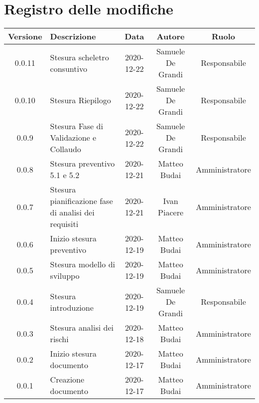 \section*{Registro delle modifiche}

\begin{center}
	\begin{longtable}{|c|p{5cm}|c|c|c|}
	\hline
	\rowcolor{lighter-grayer}
	\textbf{Versione} & \textbf{Descrizione} & \textbf{Data} & \textbf{Autore} & \textbf{Ruolo} \\
	\hline
	\endfirsthead

	0.0.11 & Stesura scheletro consuntivo & 2020-12-22 & Samuele De Grandi & Responsabile \\
	\hline
	0.0.10 & Stesura Riepilogo & 2020-12-22 & Samuele De Grandi & Responsabile \\
	\hline
	0.0.9 & Stesura Fase di Validazione e Collaudo & 2020-12-22 & Samuele De Grandi & Responsabile \\
	\hline
	0.0.8 & Stesura preventivo 5.1 e 5.2 & 2020-12-21 & Matteo Budai & Amministratore \\
	\hline
	0.0.7 & Stesura pianificazione fase di analisi dei requisiti & 2020-12-21 & Ivan Piacere & Amministratore \\
	\hline
	0.0.6 & Inizio stesura preventivo & 2020-12-19 & Matteo Budai & Amministratore \\
	\hline
	0.0.5 & Stesura modello di sviluppo & 2020-12-19 & Matteo Budai & Amministratore \\
	\hline
	0.0.4 & Stesura introduzione & 2020-12-19 & Samuele De Grandi & Responsabile \\
	\hline
	0.0.3 & Stesura analisi dei rischi & 2020-12-18 & Matteo Budai & Amministratore \\
	\hline
	0.0.2 & Inizio stesura documento & 2020-12-17 & Matteo Budai & Amministratore \\
	\hline
	0.0.1 & Creazione documento & 2020-12-17 & Matteo Budai & Amministratore \\
	\hline

	\end{longtable}
\end{center}